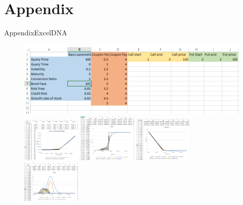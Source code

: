\documentclass{beamer}
\begin{document}
\section{Appendix}
\begin{frame}{Appendix}{ExcelDNA}
\begin{figure}
\includegraphics[width=\textwidth]{Figures/excel1.png}\\
\includegraphics[width=0.25\textwidth]{Figures/excel2.png}
\includegraphics[width=0.25\textwidth]{Figures/excel3.png}
\includegraphics[width=0.25\textwidth]{Figures/excel4.png}
\includegraphics[width=0.25\textwidth]{Figures/excel5.png}
\end{figure}
\end{frame}
\end{document}
